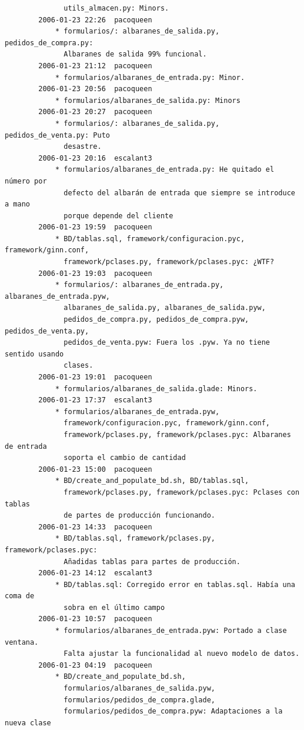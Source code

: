 \documentclass[a4paper]{article}
\begin{document}
\begin{verbatim}
              utils_almacen.py: Minors.
        2006-01-23 22:26  pacoqueen
            * formularios/: albaranes_de_salida.py, pedidos_de_compra.py:
              Albaranes de salida 99% funcional.
        2006-01-23 21:12  pacoqueen
            * formularios/albaranes_de_entrada.py: Minor.
        2006-01-23 20:56  pacoqueen
            * formularios/albaranes_de_salida.py: Minors
        2006-01-23 20:27  pacoqueen
            * formularios/: albaranes_de_salida.py, pedidos_de_venta.py: Puto
              desastre.
        2006-01-23 20:16  escalant3
            * formularios/albaranes_de_entrada.py: He quitado el número por
              defecto del albarán de entrada que siempre se introduce a mano
              porque depende del cliente
        2006-01-23 19:59  pacoqueen
            * BD/tablas.sql, framework/configuracion.pyc, framework/ginn.conf,
              framework/pclases.py, framework/pclases.pyc: ¿WTF?
        2006-01-23 19:03  pacoqueen
            * formularios/: albaranes_de_entrada.py, albaranes_de_entrada.pyw,
              albaranes_de_salida.py, albaranes_de_salida.pyw,
              pedidos_de_compra.py, pedidos_de_compra.pyw, pedidos_de_venta.py,
              pedidos_de_venta.pyw: Fuera los .pyw. Ya no tiene sentido usando
              clases.
        2006-01-23 19:01  pacoqueen
            * formularios/albaranes_de_salida.glade: Minors.
        2006-01-23 17:37  escalant3
            * formularios/albaranes_de_entrada.pyw,
              framework/configuracion.pyc, framework/ginn.conf,
              framework/pclases.py, framework/pclases.pyc: Albaranes de entrada
              soporta el cambio de cantidad
        2006-01-23 15:00  pacoqueen
            * BD/create_and_populate_bd.sh, BD/tablas.sql,
              framework/pclases.py, framework/pclases.pyc: Pclases con tablas
              de partes de producción funcionando.
        2006-01-23 14:33  pacoqueen
            * BD/tablas.sql, framework/pclases.py, framework/pclases.pyc:
              Añadidas tablas para partes de producción.
        2006-01-23 14:12  escalant3
            * BD/tablas.sql: Corregido error en tablas.sql. Había una coma de
              sobra en el último campo
        2006-01-23 10:57  pacoqueen
            * formularios/albaranes_de_entrada.pyw: Portado a clase ventana.
              Falta ajustar la funcionalidad al nuevo modelo de datos.
        2006-01-23 04:19  pacoqueen
            * BD/create_and_populate_bd.sh,
              formularios/albaranes_de_salida.pyw,
              formularios/pedidos_de_compra.glade,
              formularios/pedidos_de_compra.pyw: Adaptaciones a la nueva clase

\end{verbatim}
\end{document}
